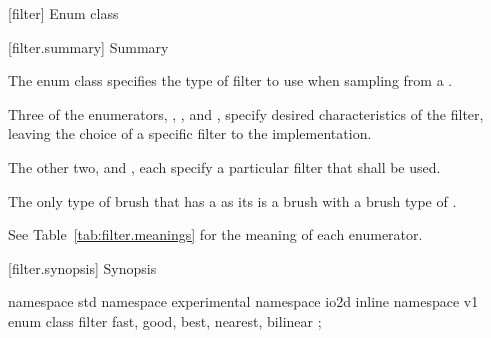  [filter] {Enum class }

 [filter.summary] { Summary}

\pnum
The  enum class specifies the type of filter to use when sampling from a \pixmap.

\pnum
Three of the  enumerators, , , and , specify desired characteristics of the filter, leaving the choice of a specific filter to the implementation. 

The other two,  and , each specify a particular filter that shall be used.

\pnum
\begin{note}
The only type of brush that has a \pixmap as its \underlyingsurface is a brush with a brush type of .
\end{note}

\pnum
See Table~\ref{tab:filter.meanings} for the meaning of each
 enumerator.

 [filter.synopsis] { Synopsis}

\begin{codeblock}
namespace std { namespace experimental { namespace io2d { inline namespace v1 {
  enum class filter {
    fast,
    good,
    best,
    nearest,
    bilinear
  };
} } } }
\end{codeblock}

